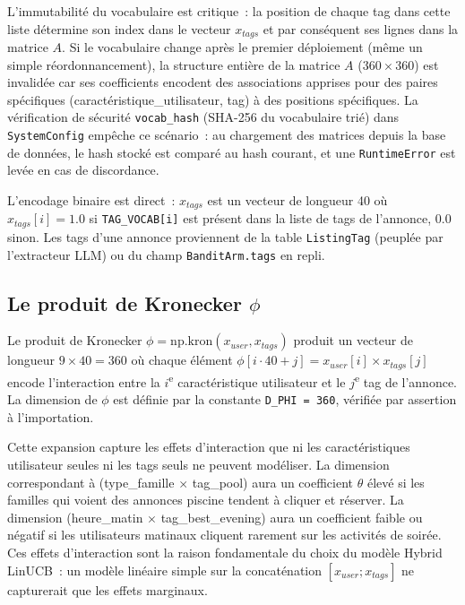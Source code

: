L'immutabilité du vocabulaire est critique~: la position de chaque tag dans cette liste
détermine son index dans le vecteur $x_{tags}$ et par conséquent ses lignes dans la matrice
$A$. Si le vocabulaire change après le premier déploiement (même un simple réordonnancement),
la structure entière de la matrice $A$ ($360 \times 360$) est invalidée car ses
coefficients encodent des associations apprises pour des paires spécifiques
(caractéristique\_utilisateur, tag) à des positions spécifiques. La vérification de sécurité
\texttt{vocab\_hash} (SHA-256 du vocabulaire trié) dans \texttt{SystemConfig} empêche ce
scénario~: au chargement des matrices depuis la base de données, le hash stocké est comparé
au hash courant, et une \texttt{RuntimeError} est levée en cas de discordance.

L'encodage binaire est direct~: $x_{tags}$ est un vecteur de longueur 40 où
$x_{tags}[i] = 1.0$ si \texttt{TAG\_VOCAB[i]} est présent dans la liste de tags de l'annonce,
$0.0$ sinon. Les tags d'une annonce proviennent de la table \texttt{ListingTag} (peuplée
par l'extracteur LLM) ou du champ \texttt{BanditArm.tags} en repli.


\subsection{Le produit de Kronecker $\phi$}

Le produit de Kronecker $\phi = \text{np.kron}(x_{user}, x_{tags})$ produit un vecteur de
longueur $9 \times 40 = 360$ où chaque élément $\phi[i \cdot 40 + j] = x_{user}[i] \times
x_{tags}[j]$ encode l'interaction entre la $i$\textsuperscript{e} caractéristique utilisateur
et le $j$\textsuperscript{e} tag de l'annonce. La dimension de $\phi$ est définie par la
constante \texttt{D\_PHI = 360}, vérifiée par assertion à l'importation.

Cette expansion capture les effets d'interaction que ni les caractéristiques utilisateur
seules ni les tags seuls ne peuvent modéliser. La dimension correspondant à
(type\_famille $\times$ tag\_pool) aura un coefficient $\theta$ élevé si les familles qui
voient des annonces piscine tendent à cliquer et réserver. La dimension
(heure\_matin $\times$ tag\_best\_evening) aura un coefficient faible ou négatif si les
utilisateurs matinaux cliquent rarement sur les activités de soirée. Ces effets d'interaction
sont la raison fondamentale du choix du modèle Hybrid LinUCB~: un modèle linéaire simple
sur la concaténation $[x_{user}; x_{tags}]$ ne capturerait que les effets marginaux.


